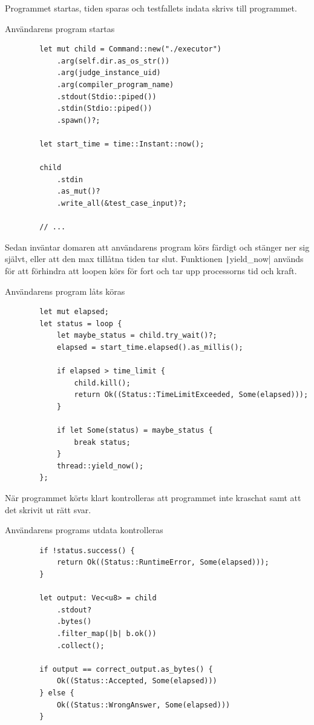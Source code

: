 \documentclass{article}
\begin{document}
Programmet startas, tiden sparas
och testfallets indata skrivs till programmet.

\begin{listing}[H]
	\caption{Användarens program startas}
	\begin{verbatim}
		let mut child = Command::new("./executor")
			.arg(self.dir.as_os_str())
			.arg(judge_instance_uid)
			.arg(compiler_program_name)
			.stdout(Stdio::piped())
			.stdin(Stdio::piped())
			.spawn()?;

		let start_time = time::Instant::now();

		child
			.stdin
			.as_mut()?
			.write_all(&test_case_input)?;

		// ...
	\end{verbatim}
\end{listing}

Sedan inväntar domaren att användarens program körs färdigt och stänger ner sig
självt, eller att den max tillåtna tiden tar slut. Funktionen
\texttt|yield_now| används för att förhindra att loopen körs för fort och tar
upp processorns tid och kraft.

\begin{listing}[H]
	\caption{Användarens program låts köras}
	\begin{verbatim}
		let mut elapsed;
		let status = loop {
			let maybe_status = child.try_wait()?;
			elapsed = start_time.elapsed().as_millis();

			if elapsed > time_limit {
				child.kill();
				return Ok((Status::TimeLimitExceeded, Some(elapsed)));
			}

			if let Some(status) = maybe_status {
				break status;
			}
			thread::yield_now();
		};
	\end{verbatim}
\end{listing}

När programmet körts klart kontrolleras att programmet inte kraschat samt att
det skrivit ut rätt svar.

\begin{listing}[H]
	\caption{Användarens programs utdata kontrolleras}
	\begin{verbatim}
		if !status.success() {
			return Ok((Status::RuntimeError, Some(elapsed)));
		}

		let output: Vec<u8> = child
			.stdout?
			.bytes()
			.filter_map(|b| b.ok())
			.collect();

		if output == correct_output.as_bytes() {
			Ok((Status::Accepted, Some(elapsed)))
		} else {
			Ok((Status::WrongAnswer, Some(elapsed)))
		}
	\end{verbatim}
\end{listing}
\end{document}

